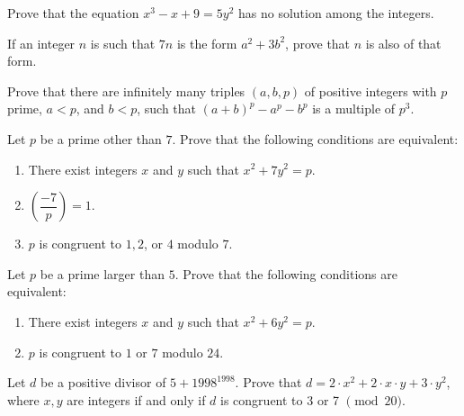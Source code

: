 \documentclass{subfile}
\begin{document}
	\begin{problem}[K\"{o}MaL] %
		Prove that the equation $x^3-x+9=5y^2$ has no solution among the integers.
	\end{problem}
	
	\begin{problem}[India 1998]
		If an integer $n$ is such that $7n$ is the form $a^2 + 3b^2$, prove that $n$ is also of that form.
	\end{problem}
	
	\begin{problem} %
		Prove that there are infinitely many triples $(a, b, p)$ of positive integers with $p$ prime, $a < p$, and $b < p$, such that $(a + b)^p - a^p - b^p$ is a multiple of $p^3$.
	\end{problem}
	
	\begin{problem}
		Let $p$ be a prime other than $7$. Prove that the following conditions are equivalent:
		\begin{enumerate}
			\item There exist integers $x$ and $y$ such that $x^2+7y^2=p$.
			\item $\left(\dfrac{-7}{p}\right) = 1$.
			\item $p$ is congruent to $1,2$, or $4$ modulo $7$.
		\end{enumerate}
	\end{problem}

	\begin{problem}
		Let $p$ be a prime larger than $5$. Prove that the following conditions are equivalent:
		\begin{enumerate}
			\item There exist integers $x$ and $y$ such that $x^2+6y^2=p$.
			\item $p$ is congruent to $1$ or $7$ modulo $24$.
		\end{enumerate}
	\end{problem}

	\begin{problem} %
		Let $d$ be a positive divisor of $5 + 1998^{1998}$. Prove that $d = 2 \cdot x^2 + 2 \cdot x \cdot y + 3 \cdot y^2$, where $x, y$ are integers if and only if $d$ is congruent to 3 or 7 $\pmod{20}$.
	\end{problem}
\end{document}
